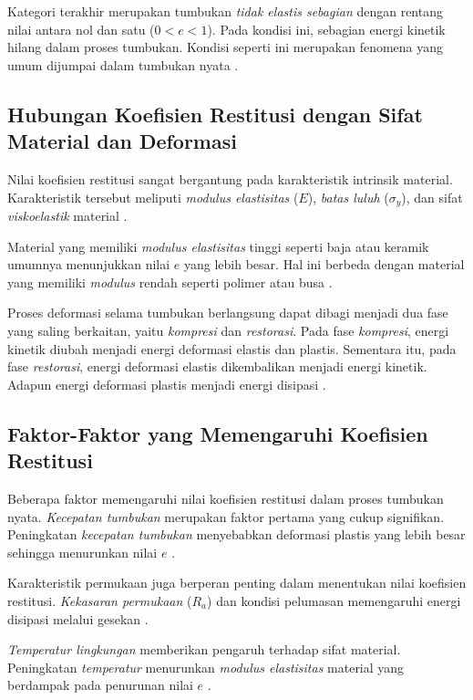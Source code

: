 Kategori terakhir merupakan tumbukan \textit{tidak elastis sebagian} dengan rentang nilai antara nol dan satu ($0 < e < 1$). Pada kondisi ini, sebagian energi kinetik hilang dalam proses tumbukan. Kondisi seperti ini merupakan fenomena yang umum dijumpai dalam tumbukan nyata \citep{cross2002coefficient}.

\subsection{Hubungan Koefisien Restitusi dengan Sifat Material dan Deformasi}
Nilai koefisien restitusi sangat bergantung pada karakteristik intrinsik material. Karakteristik tersebut meliputi \textit{modulus elastisitas} ($E$), \textit{batas luluh} (\(\sigma_y\)), dan sifat \textit{viskoelastik} material \citep{meyer2020coefficient}. 

Material yang memiliki \textit{modulus elastisitas} tinggi seperti baja atau keramik umumnya menunjukkan nilai $e$ yang lebih besar. Hal ini berbeda dengan material yang memiliki \textit{modulus} rendah seperti polimer atau busa \citep{brancazio1981physics}. 

Proses deformasi selama tumbukan berlangsung dapat dibagi menjadi dua fase yang saling berkaitan, yaitu \textit{kompresi} dan \textit{restorasi}. Pada fase \textit{kompresi}, energi kinetik diubah menjadi energi deformasi elastis dan plastis. Sementara itu, pada fase \textit{restorasi}, energi deformasi elastis dikembalikan menjadi energi kinetik. Adapun energi deformasi plastis menjadi energi disipasi \citep{hartono2019analisis}.

\subsection{Faktor-Faktor yang Memengaruhi Koefisien Restitusi}

Beberapa faktor memengaruhi nilai koefisien restitusi dalam proses tumbukan nyata. \textit{Kecepatan tumbukan} merupakan faktor pertama yang cukup signifikan. Peningkatan \textit{kecepatan tumbukan} menyebabkan deformasi plastis yang lebih besar sehingga menurunkan nilai $e$ \citep{smith2018experimental}. 

Karakteristik permukaan juga berperan penting dalam menentukan nilai koefisien restitusi. \textit{Kekasaran permukaan} ($R_a$) dan kondisi pelumasan memengaruhi energi disipasi melalui gesekan \citep{penner2002physics}. 

\textit{Temperatur lingkungan} memberikan pengaruh terhadap sifat material. Peningkatan \textit{temperatur} menurunkan \textit{modulus elastisitas} material yang berdampak pada penurunan nilai $e$ \citep{lamb1945hydrodynamics}. 

